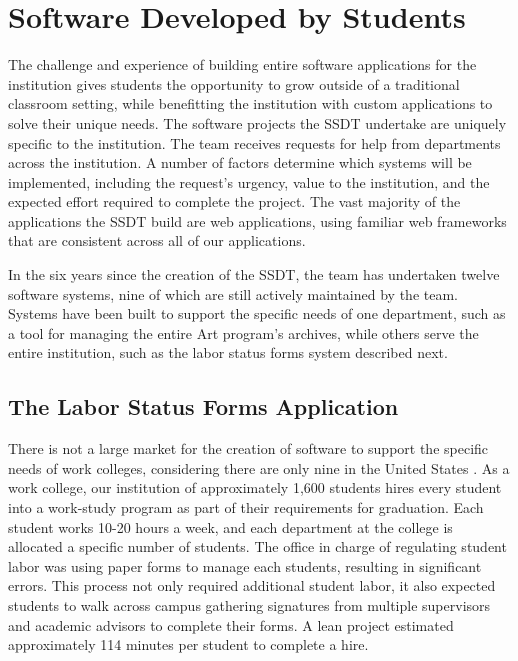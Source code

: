 \section{Software Developed by Students}

The challenge and experience of building entire software applications for the institution gives students the opportunity to grow outside of a traditional classroom setting, while benefitting the institution with custom applications to solve their unique needs. The software projects the SSDT undertake are uniquely specific to the institution. The team receives requests for help from departments across the institution. A number of factors determine which systems will be implemented, including the request’s urgency, value to the institution, and the expected effort required to complete the project. The vast majority of the applications the SSDT build are web applications, using familiar web frameworks that are consistent across all of our applications.

In the six years since the creation of the SSDT, the team has undertaken twelve software systems, nine of which are still actively maintained by the team. Systems have been built to support the specific needs of one department, such as a tool for managing the entire Art program's archives, while others serve the entire institution, such as the labor status forms system described next.

\subsection{The Labor Status Forms Application}\label{sec:software}
There is not a large market for the creation of software to support the specific needs of work colleges, considering there are only nine in the United States \cite{WCCMembers, Ecclesia}. As a work college, our institution of approximately 1,600 students hires every student into a work-study program as part of their requirements for graduation. Each student works 10-20 hours a week, and each department at the college is allocated a specific number of students. The office in charge of regulating student labor was using paper forms to manage each students, resulting in significant errors. This process not only required additional student labor, it also expected students to walk across campus gathering signatures from multiple supervisors and academic advisors to complete their forms. A lean project estimated approximately 114 minutes per student to complete a hire.

